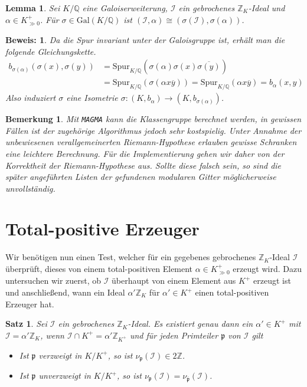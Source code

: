\documentclass[12pt,a4paper,halfparskip,headsepline,bibtotocnumbered]{scrreprt}
\theoremstyle{nummermitklammern}
\newtheorem{satz}[defsatzusw]{Satz}
\newtheorem{lemma}[defsatzusw]{Lemma}
\newtheorem{bemerkung}[defsatzusw]{Bemerkung}
\theoremstyle{nonumberbreak}
\newtheorem{beweis}{Beweis:}
\newcommand{\Z}{\mathbb{Z}}
\newcommand{\Q}{\mathbb{Q}}
\newcommand{\I}{\mathcal{I}}
\newcommand{\p}{\mathfrak{p}}
\begin{document}
\begin{framed}
	\begin{lemma}
		Sei $K / \Q$ eine Galoiserweiterung, $\I$ ein gebrochenes $\Z_K$-Ideal und $\alpha \in K^+_{\gg 0}$. Für $\sigma \in \text{Gal}(K/\Q)$ ist $(\I, \alpha) \cong \left( \sigma(\I), \sigma(\alpha) \right)$.
	\end{lemma}
\end{framed}

\begin{beweis}
	Da die Spur invariant unter der Galoisgruppe ist, erhält man die folgende Gleichungskette.
	\begin{align*}
		b_{\sigma(\alpha)} (\sigma(x), \sigma(y)) &= \text{Spur}_{K/\Q} \left( \sigma(\alpha) \sigma(x) \overline{\sigma(y)}\right)\\
		&= \text{Spur}_{K/\Q} \left( \sigma\left( \alpha x \overline{y} \right) \right) = \text{Spur}_{K/\Q} \left( \alpha x \overline{y} \right) = b_\alpha (x,y)
	\end{align*}
	Also induziert $\sigma$ eine Isometrie $\sigma : (K, b_\alpha) \rightarrow (K, b_{\sigma(\alpha)})$.
\end{beweis}

\begin{bemerkung}
	Mit \texttt{MAGMA} kann die Klassengruppe berechnet werden, in gewissen Fällen ist der zugehörige Algorithmus jedoch sehr kostspielig. Unter Annahme der unbewiesenen \textit{verallgemeinerten Riemann-Hypothese} erlauben gewisse Schranken eine leichtere Berechnung. Für die Implementierung gehen wir daher von der Korrektheit der Riemann-Hypothese aus. Sollte diese falsch sein, so sind die später angeführten Listen der gefundenen modularen Gitter möglicherweise unvollständig.
\end{bemerkung}

\section{Total-positive Erzeuger}

Wir benötigen nun einen Test, welcher für ein gegebenes gebrochenes $\Z_K$-Ideal $\I$ überprüft, dieses von einem total-positiven Element $\alpha \in K^+_{\gg 0}$ erzeugt wird. Dazu untersuchen wir zuerst, ob $\I$ überhaupt von einem Element aus $K^+$ erzeugt ist und anschließend, wann ein Ideal $\alpha'\Z_K$ für $\alpha' \in K^+$ einen total-positiven Erzeuger hat.

\begin{framed}
	\begin{satz}
		Sei $\I$ ein gebrochenes $\Z_K$-Ideal. Es existiert genau dann ein $\alpha' \in K^+$ mit $\I = \alpha' \Z_K$, wenn $\I \cap K^+ = \alpha' \Z_{K^+}$ und für jeden Primteiler $\p$ von $\I$ gilt
		\begin{itemize}
			\item Ist $\p$ verzweigt in $K / K^+$, so ist $\nu_\p(\I) \in 2\Z$.
			\item Ist $\p$ unverzweigt in $K / K^+$, so ist $\nu_\p(\I) = \nu_{\overline{\p}}(\I)$.
		\end{itemize}
	\end{satz}
\end{framed} 
\end{document}
